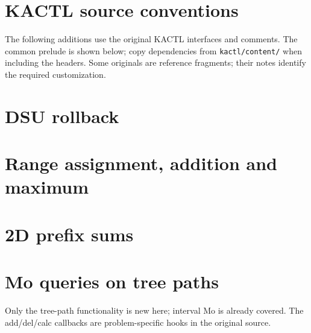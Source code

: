 \section{KACTL source conventions}
The following additions use the original KACTL interfaces and comments.
The common prelude is shown below; copy dependencies from \texttt{kactl/content/} when including the headers.
Some originals are reference fragments; their notes identify the required customization.

\section{DSU rollback}

\section{Range assignment, addition and maximum}

\section{2D prefix sums}

\section{Mo queries on tree paths}
Only the tree-path functionality is new here; interval Mo is already covered. The add/del/calc callbacks are problem-specific hooks in the original source.

